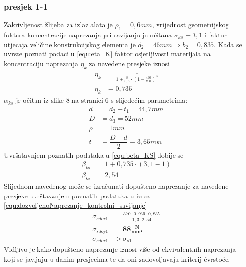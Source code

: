 \documentclass[11pt,a4paper]{article}
\begin{document}
\subsubsection*{presjek 1-1}
Zakrivljenost žlijeba za izlaz alata je $\rho_1=0,6mm$, vrijednost geometrijskog faktora koncentracije naprezanja pri savijanju je očitana $\alpha_{ks}=3,1$ i faktor utjecaja veličine konstrukcijskog elementa je $d_2=45mm \Rightarrow b_2=0,835$.
Kada se uvrste poznati podaci u \eqref{equ:eta_K} faktor osjetljivosti materijala na koncentraciju naprezanja $\eta_k$ za navedene presjeke iznosi
\begin{align*}
\eta_k&=\frac{1}{1+\frac{8}{0,6} \cdot \left( 1- \frac{490}{700} \right)^3}\\
\eta_k&=0,735
\end{align*}
$\alpha_{ks}$ je očitan iz slike 8 na stranici 6 s slijedećim parametrima:
\begin{align*}
d&=d_2-t_1=44,7mm\\
D&=d_3=52mm\\
\rho&=1mm\\
t&=\dfrac{D-d}{2}=3,65mm
\end{align*}
Uvršatavnjem poznatih podataka u \eqref{equ:beta_KS} dobije se
\begin{align*}
\beta_{ks}&=1+ 0,735 \cdot (3,1-1)\\
\beta_{ks}&=2,54
\end{align*}
Slijednom navedenog može se izračunati dopušteno naprezanje za navedene presjeke uvrštavanjem poznatih podataka u izraz \eqref{equ:dozvoljenoNaprezanje_kontrolni_savijanje}
\begin{align*}
\sigma_{sdop1}&=\frac{370 \cdot 0,939 \cdot 0,835}{1,3 \cdot 2,54}\\
\sigma_{sdop1}&=\mathbf{88\textstyle\frac{N}{mm^2}}\\
\sigma_{sdop1}&>\sigma_{s1}
\end{align*}
Vidljivo je kako dopušteno naprezanje iznosi više od ekvivalentnih naprezanja koji se javljaju u danim presjecima te da oni zadovoljavaju kriterij čvrstoće.
\end{document}
